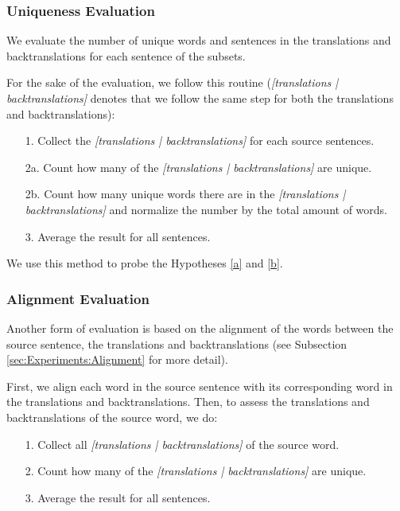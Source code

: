 \subsubsection{Uniqueness Evaluation}
\label{sec:Experiments:Statistics:Uniqueness}
We evaluate the number of unique words and sentences in the translations and backtranslations for each sentence of the subsets. 

For the sake of the evaluation, we follow this routine (\textit{[translations | backtranslations]} denotes that we follow the same step for both the translations and backtranslations):
\begin{enumerate}
    \item[1. ] Collect the \textit{[translations | backtranslations]} for each source sentences.
    \item[2a. ] Count how many of the \textit{[translations | backtranslations]} are unique. 
    \item[2b. ] Count how many unique words there are in the \textit{[translations | backtranslations]} and normalize the number by the total amount of words. 
    \item[3. ] Average the result for all sentences.
\end{enumerate}

We use this method to probe the Hypotheses \ref{a} and \ref{b}. 

\subsubsection{Alignment Evaluation}
\label{sec:Experiments:Statistics:Alignment}
Another form of evaluation is based on the alignment of the words between the source sentence, the translations and backtranslations (see Subsection \ref{sec:Experiments:Alignment} for more detail).

First, we align each word in the source sentence with its corresponding word in the translations and backtranslations. Then, to assess the translations and backtranslations of the source word, we do:
\begin{enumerate}
    \item[1. ] Collect all \textit{[translations | backtranslations]} of the source word.
    \item[2. ] Count how many of the \textit{[translations | backtranslations]} are unique.
    \item[3. ] Average the result for all sentences.
\end{enumerate}

